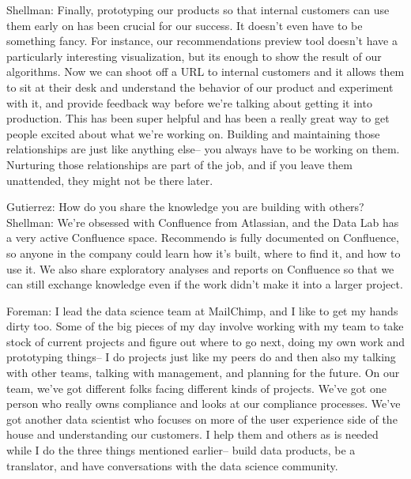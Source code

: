 Shellman: Finally, prototyping our products so that internal
customers can use them early on has been crucial for
our success. It doesn't even have to be something
fancy. For instance, our recommendations preview
tool doesn't have a particularly interesting
visualization, but its enough to show the result of our
algorithms. Now we can shoot off a URL to internal
customers and it allows them to sit at their desk and
understand the behavior of our product and
experiment with it, and provide feedback way before
we're talking about getting it into production. This
has been super helpful and has been a really great
way to get people excited about what we're working
on. Building and maintaining those relationships are
just like anything else-- you always have to be
working on them. Nurturing those relationships are
part of the job, and if you leave them unattended,
they might not be there later.

Gutierrez: How do you share the knowledge you are
building with others?
Shellman: We’re obsessed with Conﬂuence from
Atlassian, and the Data Lab has a very active
Conﬂuence space. Recommendo is fully documented
on Conﬂuence, so anyone in the company could learn
how it’s built, where to ﬁnd it, and how to use it. We
also share exploratory analyses and reports on
Conﬂuence so that we can still exchange knowledge
even if the work didn’t make it into a larger project.

Foreman: I lead the data science team at
MailChimp, and I like to get my hands dirty too.
Some of the big pieces of my day involve working
with my team to take stock of current projects and
figure out where to go next, doing my own work and
prototyping things-- I do projects just like my peers
do and then also my talking with other teams,
talking with management, and planning for the
future.
On our team, we’ve got different folks facing different
kinds of projects. We’ve got one person who really
owns compliance and looks at our compliance
processes. We’ve got another data scientist who
focuses on more of the user experience side of the
house and understanding our customers. I help them
and others as is needed while I do the three things
mentioned earlier-- build data products, be a
translator, and have conversations with the data
science community.

